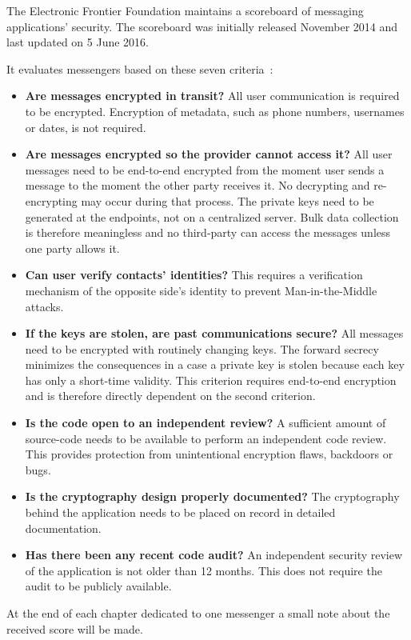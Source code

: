 \documentclass[thesis=M,english]{FITthesis}[2012/10/20]
\begin{document}
The Electronic Frontier Foundation maintains a scoreboard of messaging applications' security. The scoreboard was initially released November 2014 and last updated on 5 June 2016.

It evaluates messengers based on these seven criteria~\cite{eff-score}:

\begin{itemize}
	\item \textbf{Are messages encrypted in transit?} All user communication is required to be encrypted. Encryption of metadata, such as phone numbers, usernames or dates, is not required. %
	\item \textbf{Are messages encrypted so the provider cannot access it?} All user messages need to be end-to-end encrypted from the moment user sends a message to the moment the other party receives it. No decrypting and re-encrypting may occur during that process. The private keys need to be generated at the endpoints, not on a centralized server. Bulk data collection is therefore meaningless and no third-party can access the messages unless one party allows it.
	\item \textbf{Can user verify contacts' identities?} This requires a verification mechanism of the opposite side's identity to prevent Man-in-the-Middle attacks. 
	\item \textbf{If the keys are stolen, are past communications secure?} All messages need to be encrypted with routinely changing keys. The forward secrecy minimizes the consequences in a case a private key is stolen because each key has only a short-time validity. This criterion requires end-to-end encryption and is therefore directly dependent on the second criterion.
	\item \textbf{Is the code open to an independent review?} A sufficient amount of source-code needs to be available to perform an independent code review. This provides protection from unintentional encryption flaws, backdoors or bugs.
	\item \textbf{Is the cryptography design properly documented?} The cryptography behind the application needs to be placed on record in detailed documentation.
	\item \textbf{Has there been any recent code audit?} An independent security review of the application is not older than 12 months. This does not require the audit to be publicly available.
\end{itemize}

At the end of each chapter dedicated to one messenger a small note about the received score will be made.
\end{document}
